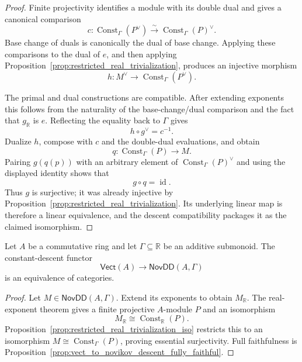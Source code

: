 \begin{proof}
  \leanok
  Finite projectivity identifies a module with its double dual and gives a
  canonical comparison
  \[
    c\colon\operatorname{Const}_\Gamma(P^\vee)
      \xrightarrow{\sim}\operatorname{Const}_\Gamma(P)^\vee.
  \]
  Base change of duals is canonically the dual of base change.  Applying these
  comparisons to the dual of $e$, and then applying
  Proposition~\ref{prop:restricted_real_trivialization}, produces an injective
  morphism
  \[
    h\colon M^\vee\longrightarrow
      \operatorname{Const}_\Gamma(P^\vee).
  \]

  The primal and dual constructions are compatible.  After extending
  exponents this follows from the naturality of the base-change/dual
  comparison and the fact that $g_{\mathbb{R}}$ is $e$.  Reflecting the equality
  back to $\Gamma$ gives
  \[
    h\circ g^\vee=c^{-1}.
  \]
  Dualize $h$, compose with $c$ and the double-dual evaluations, and obtain
  \[
    q\colon\operatorname{Const}_\Gamma(P)\longrightarrow M.
  \]
  Pairing $g(q(p))$ with an arbitrary element of
  $\operatorname{Const}_\Gamma(P)^\vee$ and using the displayed identity shows
  that
  \[
    g\circ q=\operatorname{id}.
  \]
  Thus $g$ is surjective; it was already injective by
  Proposition~\ref{prop:restricted_real_trivialization}.  Its underlying
  linear map is therefore a linear equivalence, and the descent compatibility
  packages it as the claimed isomorphism.
\end{proof}

\begin{theorem}
  \label{thm:novikov_descent_equivalence}
  \leanok
  Let $A$ be a commutative ring and let
  $\Gamma\subseteq\mathbb{R}$ be an additive submonoid.  The constant-descent
  functor
  \[
    \mathsf{Vect}(A)\longrightarrow\mathsf{NovDD}(A,\Gamma)
  \]
  is an equivalence of categories.
\end{theorem}

\begin{proof}
  \leanok
  Let $M\in\mathsf{NovDD}(A,\Gamma)$.  Extend its exponents to obtain
  $M_{\mathbb{R}}$.  The real-exponent theorem gives a finite projective
  $A$-module $P$ and an isomorphism
  \[
    M_{\mathbb{R}}\cong\operatorname{Const}_{\mathbb{R}}(P).
  \]
  Proposition~\ref{prop:restricted_real_trivialization_iso} restricts this to
  an isomorphism
  $M\cong\operatorname{Const}_\Gamma(P)$, proving essential surjectivity.
  Full faithfulness is
  Proposition~\ref{prop:vect_to_novikov_descent_fully_faithful}.
\end{proof}
